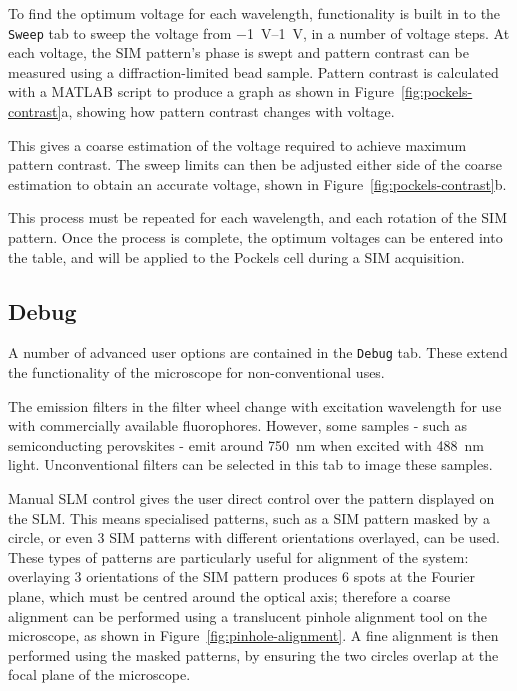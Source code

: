 To find the optimum voltage for each wavelength, functionality is built in to the \texttt{Sweep} tab to sweep the voltage from \SIrange{-1}{1}{\volt}, in a number of voltage steps. 
At each voltage, the SIM pattern's phase is swept and pattern contrast can be measured using a diffraction-limited bead sample. 
Pattern contrast is calculated with a MATLAB script to produce a graph as shown in Figure~\ref{fig:pockels-contrast}a, showing how pattern contrast changes with voltage. 

This gives a coarse estimation of the voltage required to achieve maximum pattern contrast. 
The sweep limits can then be adjusted either side of the coarse estimation to obtain an accurate voltage, shown in Figure~\ref{fig:pockels-contrast}b. 

This process must be repeated for each wavelength, and each rotation of the SIM pattern. 
Once the process is complete, the optimum voltages can be entered into the table, and will be applied to the Pockels cell during a SIM acquisition. 


\subsection{Debug}
A number of advanced user options are contained in the \texttt{Debug} tab. 
These extend the functionality of the microscope for non-conventional uses. 

The emission filters in the filter wheel change with excitation wavelength for use with commercially available fluorophores.
However, some samples - such as semiconducting perovskites - emit around \SI{750}{\nano\metre} when excited with \SI{488}{\nano\metre} light. 
Unconventional filters can be selected in this tab to image these samples. 

Manual SLM control gives the user direct control over the pattern displayed on the SLM. 
This means specialised patterns, such as a SIM pattern masked by a circle, or even 3 SIM patterns with different orientations overlayed, can be used.
These types of patterns are particularly useful for alignment of the system: overlaying 3 orientations of the SIM pattern produces 6 spots at the Fourier plane, which must be centred around the optical axis; therefore a coarse alignment can be performed using a translucent pinhole alignment tool on the microscope, as shown in Figure~\ref{fig:pinhole-alignment}. 
A fine alignment is then performed using the masked patterns, by ensuring the two circles overlap at the focal plane of the microscope. 

